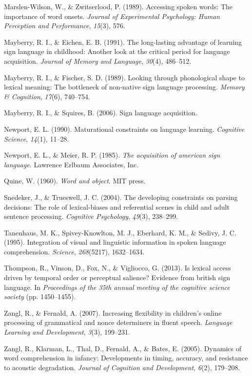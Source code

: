 \documentclass[12pt,]{article}
\begin{document}
Marslen-Wilson, W., \& Zwitserlood, P. (1989). Accessing spoken words:
The importance of word onsets. \emph{Journal of Experimental Psychology:
Human Perception and Performance}, \emph{15}(3), 576.

Mayberry, R. I., \& Eichen, E. B. (1991). The long-lasting advantage of
learning sign language in childhood: Another look at the critical period
for language acquisition. \emph{Journal of Memory and Language},
\emph{30}(4), 486--512.

Mayberry, R. I., \& Fischer, S. D. (1989). Looking through phonological
shape to lexical meaning: The bottleneck of non-native sign language
processing. \emph{Memory \& Cognition}, \emph{17}(6), 740--754.

Mayberry, R. I., \& Squires, B. (2006). Sign language acquisition.

Newport, E. L. (1990). Maturational constraints on language learning.
\emph{Cognitive Science}, \emph{14}(1), 11--28.

Newport, E. L., \& Meier, R. P. (1985). \emph{The acquisition of
american sign language.} Lawrence Erlbaum Associates, Inc.

Quine, W. (1960). \emph{Word and object}. MIT press.

Snedeker, J., \& Trueswell, J. C. (2004). The developing constraints on
parsing decisions: The role of lexical-biases and referential scenes in
child and adult sentence processing. \emph{Cognitive Psychology},
\emph{49}(3), 238--299.

Tanenhaus, M. K., Spivey-Knowlton, M. J., Eberhard, K. M., \& Sedivy, J.
C. (1995). Integration of visual and linguistic information in spoken
language comprehension. \emph{Science}, \emph{268}(5217), 1632--1634.

Thompson, R., Vinson, D., Fox, N., \& Vigliocco, G. (2013). Is lexical
access driven by temporal order or perceptual salience? Evidence from
british sign language. In \emph{Proceedings of the 35th annual meeting
of the cognitive science society} (pp. 1450--1455).

Zangl, R., \& Fernald, A. (2007). Increasing flexibility in children's
online processing of grammatical and nonce determiners in fluent speech.
\emph{Language Learning and Development}, \emph{3}(3), 199--231.

Zangl, R., Klarman, L., Thal, D., Fernald, A., \& Bates, E. (2005).
Dynamics of word comprehension in infancy: Developments in timing,
accuracy, and resistance to acoustic degradation. \emph{Journal of
Cognition and Development}, \emph{6}(2), 179--208.
\end{document}
